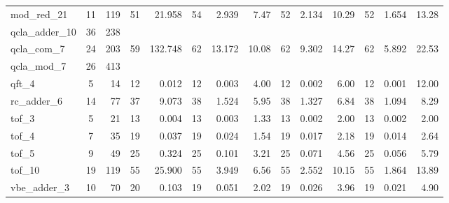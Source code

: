 \begin{table}[htbp]
\begin{tabular}{l c r | r r | r r r | r r r | r r r}
mod\_red\_21 & 11 & 119 & \cellcolor{bestT}51 & 21.958 & 54 & 2.939 & 7.47 & 52 & 2.134 & 10.29 & 52 & \cellcolor{bestTime}1.654 & \cellcolor{bestTime}13.28 \\
qcla\_adder\_10 & 36 & 238 & & & & & & & & & & & \\
qcla\_com\_7 & 24 & 203 & \cellcolor{bestT}59 & 132.748 & 62 & 13.172 & 10.08 & 62 & 9.302 & 14.27 & 62 & \cellcolor{bestTime}5.892 & \cellcolor{bestTime}22.53 \\
qcla\_mod\_7 & 26 & 413 & & & & & & & & & & & \\
qft\_4 & 5 & 14 & \cellcolor{bestT}12 & 0.012 & \cellcolor{bestT}12 & 0.003 & 4.00 & \cellcolor{bestT}12 & 0.002 & 6.00 & \cellcolor{bestT}12 & \cellcolor{bestTime}0.001 & \cellcolor{bestTime}12.00 \\
rc\_adder\_6 & 14 & 77 & \cellcolor{bestT}37 & 9.073 & 38 & 1.524 & 5.95 & 38 & 1.327 & 6.84 & 38 & \cellcolor{bestTime}1.094 & \cellcolor{bestTime}8.29 \\
tof\_3 & 5 & 21 & \cellcolor{bestT}13 & 0.004 & \cellcolor{bestT}13 & 0.003 & 1.33 & \cellcolor{bestT}13 & \cellcolor{bestTime}0.002 & \cellcolor{bestTime}2.00 & \cellcolor{bestT}13 & \cellcolor{bestTime}0.002 & \cellcolor{bestTime}2.00 \\
tof\_4 & 7 & 35 & \cellcolor{bestT}19 & 0.037 & \cellcolor{bestT}19 & 0.024 & 1.54 & \cellcolor{bestT}19 & 0.017 & 2.18 & \cellcolor{bestT}19 & \cellcolor{bestTime}0.014 & \cellcolor{bestTime}2.64 \\
tof\_5 & 9 & 49 & \cellcolor{bestT}25 & 0.324 & \cellcolor{bestT}25 & 0.101 & 3.21 & \cellcolor{bestT}25 & 0.071 & 4.56 & \cellcolor{bestT}25 & \cellcolor{bestTime}0.056 & \cellcolor{bestTime}5.79 \\
tof\_10 & 19 & 119 & \cellcolor{bestT}55 & 25.900 & \cellcolor{bestT}55 & 3.949 & 6.56 & \cellcolor{bestT}55 & 2.552 & 10.15 & \cellcolor{bestT}55 & \cellcolor{bestTime}1.864 & \cellcolor{bestTime}13.89 \\
vbe\_adder\_3 & 10 & 70 & 20 & 0.103 & \cellcolor{bestT}19 & 0.051 & 2.02 & \cellcolor{bestT}19 & 0.026 & 3.96 & \cellcolor{bestT}19 & \cellcolor{bestTime}0.021 & \cellcolor{bestTime}4.90 \\
\bottomrule
\end{tabular}
\end{table}



